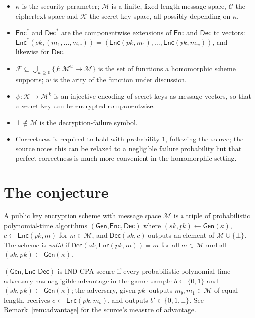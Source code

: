 \documentclass{aicr-conjecture}
\newcommand{\Gen}{\mathsf{Gen}}
\newcommand{\Enc}{\mathsf{Enc}}
\newcommand{\Dec}{\mathsf{Dec}}
\newcommand{\Msp}{\mathcal{M}}
\newcommand{\Csp}{\mathcal{C}}
\newcommand{\Ksp}{\mathcal{K}}
\newcommand{\Fset}{\mathcal{F}}
\newcommand{\secpar}{\kappa}
\begin{document}
\begin{itemize}
\item $\secpar$ is the security parameter; $\Msp$ is a finite,
  fixed-length message space, $\Csp$ the ciphertext space and $\Ksp$
  the secret-key space, all possibly depending on $\secpar$.
\item $\Enc^{*}$ and $\Dec^{*}$ are the componentwise extensions of
  $\Enc$ and $\Dec$ to vectors: $\Enc^{*}(pk, (m_{1}, \dots, m_{w})) =
  (\Enc(pk, m_{1}), \dots, \Enc(pk, m_{w}))$, and likewise for $\Dec$.
\item $\Fset \subseteq \bigcup_{w \ge 0}\{f : \Msp^{w} \to \Msp\}$ is
  the set of functions a homomorphic scheme supports; $w$ is the arity
  of the function under discussion.
\item $\psi : \Ksp \to \Msp^{k}$ is an injective encoding of secret
  keys as message vectors, so that a secret key can be encrypted
  componentwise.
\item $\bot \notin \Msp$ is the decryption-failure symbol.
\item Correctness is required to hold with probability $1$, following
  the source; the source notes this can be relaxed to a negligible
  failure probability but that perfect correctness is much more
  convenient in the homomorphic setting.
\end{itemize}

\section{The conjecture}\label{sec:conjectures}

\begin{definition}\label{def:scheme}
A public key encryption scheme with message space $\Msp$ is a triple
of probabilistic polynomial-time algorithms $(\Gen, \Enc, \Dec)$ where
$(sk, pk) \gets \Gen(\secpar)$, $c \gets \Enc(pk, m)$ for $m \in \Msp$,
and $\Dec(sk, c)$ outputs an element of $\Msp \cup \{\bot\}$. The scheme
is \emph{valid} if $\Dec(sk, \Enc(pk, m)) = m$ for all $m \in \Msp$ and
all $(sk, pk) \gets \Gen(\secpar)$.
\end{definition}

\begin{definition}\label{def:indcpa}
$(\Gen, \Enc, \Dec)$ is IND-CPA secure if every probabilistic
polynomial-time adversary has negligible advantage in the game: sample
$b \gets \{0,1\}$ and $(sk, pk) \gets \Gen(\secpar)$; the adversary,
given $pk$, outputs $m_{0}, m_{1} \in \Msp$ of equal length, receives
$c \gets \Enc(pk, m_{b})$, and outputs $b' \in \{0, 1, \bot\}$. See
Remark~\ref{rem:advantage} for the source's measure of advantage.
\end{definition}
\end{document}
